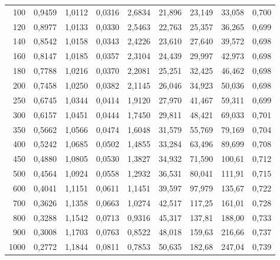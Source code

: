 \begin{tabular}{r|c|c|c|c|c|c|c|c}
    100  & 0,9459 & 1,0112 & 0,0316    & 2,6834      & 21,896     & 23,149    & 33,058   & 0,700         \\
    120  & 0,8977 & 1,0133 & 0,0330    & 2,5463      & 22,763     & 25,357    & 36,265   & 0,699         \\
    140  & 0,8542 & 1,0158 & 0,0343    & 2,4226      & 23,610     & 27,640    & 39,572   & 0,698         \\
    160  & 0,8147 & 1,0185 & 0,0357    & 2,3104      & 24,439     & 29,997    & 42,973   & 0,698         \\
    180  & 0,7788 & 1,0216 & 0,0370    & 2,2081      & 25,251     & 32,425    & 46,462   & 0,698         \\ \hline
    200  & 0,7458 & 1,0250 & 0,0382    & 2,1145      & 26,046     & 34,923    & 50,036   & 0,698         \\
    250  & 0,6745 & 1,0344 & 0,0414    & 1,9120      & 27,970     & 41,467    & 59,311   & 0,699         \\
    300  & 0,6157 & 1,0451 & 0,0444    & 1,7450      & 29,811     & 48,421    & 69,033   & 0,701         \\
    350  & 0,5662 & 1,0566 & 0,0474    & 1,6048      & 31,579     & 55,769    & 79,169   & 0,704         \\
    400  & 0,5242 & 1,0685 & 0,0502    & 1,4855      & 33,284     & 63,496    & 89,699   & 0,708         \\
    450  & 0,4880 & 1,0805 & 0,0530    & 1,3827      & 34,932     & 71,590    & 100,61   & 0,712         \\ \hline
    500  & 0,4564 & 1,0924 & 0,0558    & 1,2932      & 36,531     & 80,041    & 111,91   & 0,715         \\
    600  & 0,4041 & 1,1151 & 0,0611    & 1,1451      & 39,597     & 97,979    & 135,67   & 0,722         \\
    700  & 0,3626 & 1,1358 & 0,0663    & 1,0274      & 42,517     & 117,25    & 161,01   & 0,728         \\
    800  & 0,3288 & 1,1542 & 0,0713    & 0,9316      & 45,317     & 137,81    & 188,00   & 0,733         \\
    900  & 0,3008 & 1,1703 & 0,0763    & 0,8522      & 48,018     & 159,63    & 216,66   & 0,737         \\
    1000 & 0,2772 & 1,1844 & 0,0811    & 0,7853      & 50,635     & 182,68    & 247,04   & 0,739         \\
\end{tabular}
\\ \vspace{4mm}
